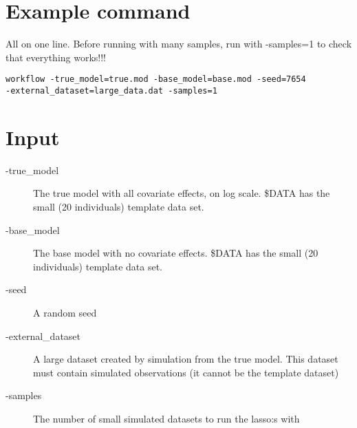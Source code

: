 
\setlength{\evensidemargin}{0pt}
\setlength{\oddsidemargin}{0pt}




\maketitle

\section{Example command}
All on one line. Before running with many samples, run with -samples=1 to check 
that everything works!!!
\begin{verbatim}
workflow -true_model=true.mod -base_model=base.mod -seed=7654
-external_dataset=large_data.dat -samples=1
\end{verbatim}
\section{Input}


\begin{description}
\item[-true\_model] The true model with all covariate effects, on log scale. 
\$DATA has the  small (20 individuals) template data set.
\item[-base\_model] The base model with no covariate effects. \$DATA has the 
small (20 individuals) template data set.
\item[-seed] A random seed
\item[-external\_dataset] A large dataset created by simulation from the true
model. This dataset must contain simulated observations (it cannot be the
template dataset)
\item[-samples] The number of small simulated datasets to run the lasso:s
with
\end{description}

